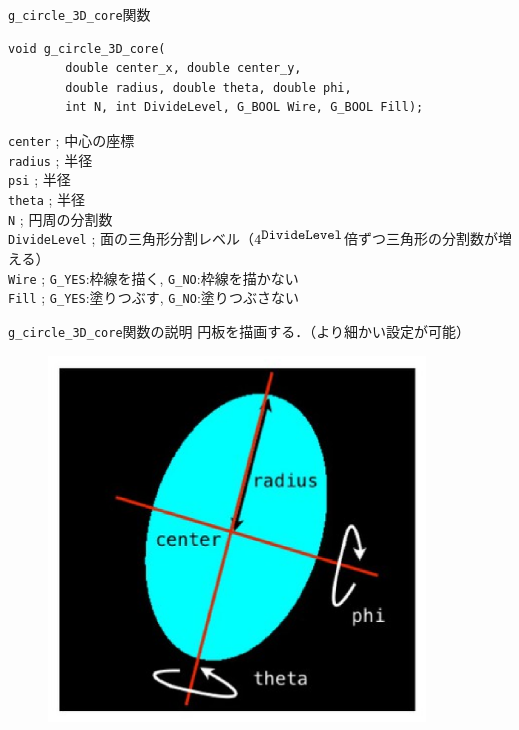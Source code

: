 \documentclass[platex,a4paper,12pt]{jsarticle}%
\begin{document}
\begin{itembox}[l]{\texttt{g\_circle\_3D\_core}関数}
\begin{verbatim}
void g_circle_3D_core(
        double center_x, double center_y,
        double radius, double theta, double phi,        
        int N, int DivideLevel, G_BOOL Wire, G_BOOL Fill);
\end{verbatim}
\verb|center| ; 中心の座標\\
\verb|radius| ; 半径\\
\verb|psi| ; 半径\\
\verb|theta| ; 半径\\
\verb|N| ; 円周の分割数 \\
\verb|DivideLevel| ; 面の三角形分割レベル（$4^{\verb|DivideLevel|}$倍ずつ三角形の分割数が増える）\\
\verb|Wire| ; \verb|G_YES|:枠線を描く, \verb|G_NO|:枠線を描かない \\
\verb|Fill| ; \verb|G_YES|:塗りつぶす, \verb|G_NO|:塗りつぶさない 
\end{itembox}

\begin{itembox}[l]{\texttt{g\_circle\_3D\_core}関数の説明}
円板を描画する．（より細かい設定が可能）
\end{itembox}
\begin{figure}[htb]
\centering
	\includegraphics[width=100mm]{Canvas_g_circle.eps}
\end{figure}
\end{document}

